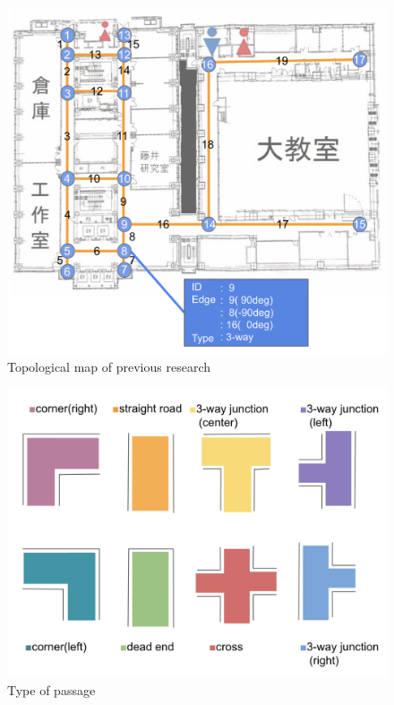 \documentclass[../main]{subfiles}
\begin{document}
    \begin{figure}[H]
        \centering
        \includegraphics[width = 14cm]{../images/shimada_topological_map.png}
        \caption{Topological map of previous research}
        \label{figure::topologicalmap_simada}
    \end{figure}

    \begin{figure}[H]
        \centering
        \includegraphics[width = 13cm]{../images/aisle_type2.png}
        \caption{Type of passage}
        \label{figure::aisle_exp}
    \end{figure}
\end{document}
